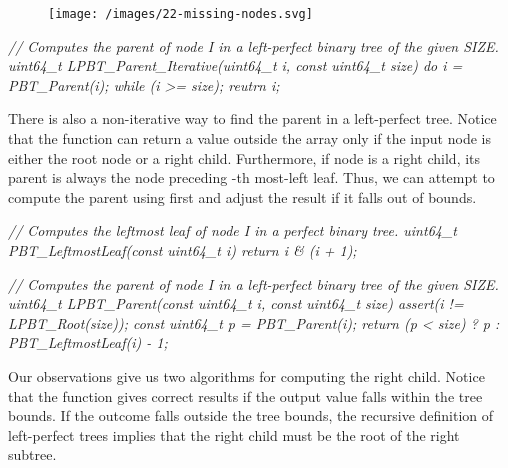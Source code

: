 \documentclass{article}
\begin{document}
\begin{figure}[grayscale-diagram]
  \texttt{[image: /images/22-missing-nodes.svg]}
\end{figure}

\begin{code}[c]
\em{// Computes the parent of node I in a left-perfect binary tree of the given SIZE.}
uint64_t LPBT_Parent_Iterative(uint64_t i, const uint64_t size) {
    do { i = PBT_Parent(i); } while (i >= size);
    reutrn i;
}
\end{code}

There is also a non-iterative way to find the parent in a left-perfect tree.
Notice that the  function can return a value outside the array only if the input node is either the root node or a right child.
Furthermore, if node  is a right child, its parent is always the node preceding -th most-left leaf. 
Thus, we can attempt to compute the parent using  first and adjust the result if it falls out of bounds.

\begin{code}[c]
\em{// Computes the leftmost leaf of node I in a perfect binary tree.}
uint64_t PBT_LeftmostLeaf(const uint64_t i) {
    return i & (i + 1);
}

\em{// Computes the parent of node I in a left-perfect binary tree of the given SIZE.}
uint64_t LPBT_Parent(const uint64_t i, const uint64_t size) {
    assert(i != LPBT_Root(size));
    const uint64_t p = PBT_Parent(i);
    return (p < size) ? p : PBT_LeftmostLeaf(i) - 1;
}
\end{code}

Our observations give us two algorithms for computing the right child.
Notice that the  function gives correct results if the output value falls within the tree bounds.
If the outcome falls outside the tree bounds, the recursive definition of left-perfect trees implies that the right child must be the root of the right subtree.
\end{document}
